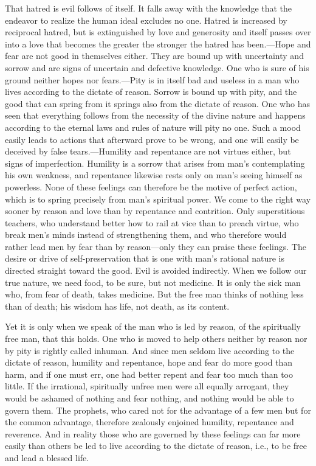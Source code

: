 \documentclass[12pt]{book}
\newcommand{\opage}[1]{\marginnote{\footnotesize\textit{[#1]}}}
\begin{document}
That hatred is evil follows of itself. It falls away with the knowledge that the
endeavor to realize the human ideal excludes no one. Hatred is increased by reciprocal
hatred, but is extinguished \opage{137}by love and generosity and itself passes over into
a love that becomes the greater the stronger the hatred has been.---Hope and fear are not
good in themselves either. They are bound up with uncertainty and sorrow and are signs of
uncertain and defective knowledge. One who is sure of his ground neither hopes nor
fears.---Pity is in itself bad and useless in a man who lives according to the dictate
of reason. Sorrow is bound up with pity, and the good that can spring from it springs
also from the dictate of reason. One who has seen that everything follows from the
necessity of the divine nature and happens according to the eternal laws and rules of
nature will pity no one. Such a mood easily leads to actions that afterward prove to be
wrong, and one will easily be deceived by false tears.---Humility and repentance are not
virtues either, but signs of imperfection. Humility is a sorrow that arises from man's
contemplating his own weakness, and repentance likewise rests only on man's seeing
himself as powerless. None of these feelings can therefore be the motive of perfect
action, which is to spring precisely from man's spiritual power. We come to the right
way sooner by reason and love than by repentance and contrition. Only superstitious
teachers, who understand better how to rail at vice than to preach virtue, who break
men's minds instead of strengthening them, and who therefore would rather lead men by
fear than by reason---only they can praise these feelings. The desire or drive of
self-preservation that is one with man's rational nature is directed straight toward the
good. \opage{138}Evil is avoided indirectly. When we follow our true nature, we need
food, to be sure, but not medicine. It is only the sick man who, from fear of death,
takes medicine. But the free man thinks of nothing less than of death; his wisdom has
life, not death, as its content.

Yet it is only when we speak of the man who is led by reason, of the spiritually free
man, that this holds. One who is moved to help others neither by reason nor by pity is
rightly called inhuman. And since men seldom live according to the dictate of reason,
humility and repentance, hope and fear do more good than harm, and if one must err, one
had better repent and fear too much than too little. If the irrational, spiritually
unfree men were all equally arrogant, they would be ashamed of nothing and fear nothing,
and nothing would be able to govern them. The prophets, who cared not for the advantage
of a few men but for the common advantage, therefore zealously enjoined humility,
repentance and reverence. And in reality those who are governed by these feelings can
far more easily than others be led to live according to the dictate of reason, i.e., to
be free and lead a blessed life.
\end{document}

